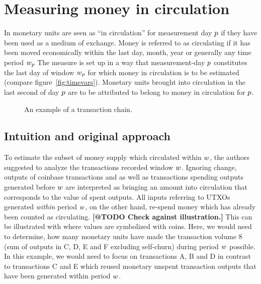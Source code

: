 \section{Measuring money in circulation}
\label{sec:measure}%

In \cite{pernice2019cryptocurrencies} monetary units are seen as ``in circulation'' for measurement day \({p}\)
if they have been used as a medium of exchange. %
Money is referred to as circulating if it has been moved economically within the last day, month, year or generally any time period ${w}_{p}$%
The measure is set up in a way that measurement-day \({p}\) constitutes the last day of window \({w}_{p}\) for which money in circulation is to be estimated (compare figure~\ref{fig:timevars}). %
Monetary units brought into circulation in the last second of day \({p}\) are to be attributed to belong to money in circulation for \({p}\). %

\begin{figure}[ht!]%
	\centering
	\ifdefined\varInputFigs%
	
	\else%
	\fi%
	\caption{%
		An example of a transaction chain. %
	}%
	\label{fig:mcirc_concept}%
\end{figure}%


\subsection{Intuition and original approach}
\label{sec:orig_approach}%
To estimate the subset of money supply which circulated within ${w}$, the authors suggested to analyze the transactions recorded window ${w}$.  %
Ignoring change, outputs of coinbase transactions and as well as transactions spending outputs generated before ${w}$ are interpreted as bringing an amount into circulation that corresponds to the value of spent outputs.  %
All inputs referring to UTXOs generated \emph{within} period ${w}$, on the
other hand, re-spend money which has already been counted as circulating.%
%
\textbf{[@TODO Check against illustration.]}
This can be illustrated with  where values are symbolized with coins. %
Here, we would need to determine, how many monetary units have made the transaction volume $8$ (sum of outputs in C, D, E and F excluding self-churn) during period ${w}$ possible. %
In this example, we would need to focus on transactions A, B and D in contrast to transactions C and E which reused monetary unspent transaction outputs that have been generated within period ${w}$. %

